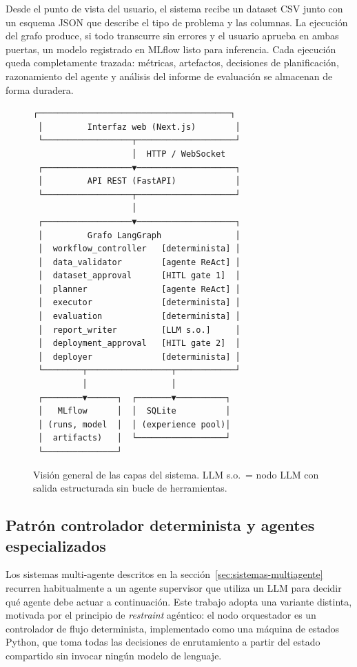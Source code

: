 Desde el punto de vista del usuario, el sistema recibe un dataset CSV junto con un esquema JSON que describe el tipo de problema y las columnas. La ejecución del grafo produce, si todo transcurre sin errores y el usuario aprueba en ambas puertas, un modelo registrado en MLflow listo para inferencia. Cada ejecución queda completamente trazada: métricas, artefactos, decisiones de planificación, razonamiento del agente y análisis del informe de evaluación se almacenan de forma duradera.

\begin{figure}[H]
\centering
\begin{Verbatim}[fontsize=\small]
 ┌───────────────────────────────────────┐
 │         Interfaz web (Next.js)        │
 └──────────────────┬────────────────────┘
                    │  HTTP / WebSocket
 ┌──────────────────▼────────────────────┐
 │         API REST (FastAPI)            │
 └──────────────────┬────────────────────┘
                    │
 ┌──────────────────▼────────────────────┐
 │         Grafo LangGraph               │
 │  workflow_controller   [determinista] │
 │  data_validator        [agente ReAct] │
 │  dataset_approval      [HITL gate 1]  │
 │  planner               [agente ReAct] │
 │  executor              [determinista] │
 │  evaluation            [determinista] │
 │  report_writer         [LLM s.o.]     │
 │  deployment_approval   [HITL gate 2]  │
 │  deployer              [determinista] │
 └────────┬─────────────────┬────────────┘
          │                 │
 ┌────────▼──────┐  ┌───────▼──────────┐
 │   MLflow      │  │  SQLite          │
 │ (runs, model  │  │ (experience pool)│
 │  artifacts)   │  └──────────────────┘
 └───────────────┘
\end{Verbatim}
\caption{Visión general de las capas del sistema. LLM s.o.\ = nodo LLM con salida estructurada sin bucle de herramientas.}
\label{fig:vision-general}
\end{figure}


\subsection{Patrón controlador determinista y agentes especializados}
\label{sec:patron-supervisor}

Los sistemas multi-agente descritos en la sección~\ref{sec:sistemas-multiagente} recurren habitualmente a un agente supervisor que utiliza un LLM para decidir qué agente debe actuar a continuación. Este trabajo adopta una variante distinta, motivada por el principio de \emph{restraint} agéntico: el nodo orquestador es un controlador de flujo determinista, implementado como una máquina de estados Python, que toma todas las decisiones de enrutamiento a partir del estado compartido sin invocar ningún modelo de lenguaje.


